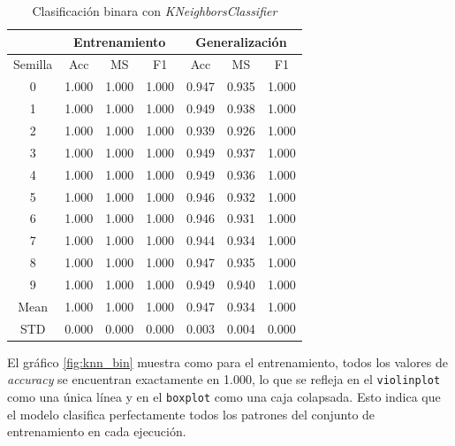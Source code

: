 \begin{table}[H]
	\centering
	\begin{tabular}{ |c|c|c|c|c|c|c| }
		\hline
		\rowcolor{LightCyan}
		 & \multicolumn{3}{c|}{Entrenamiento} & \multicolumn{3}{c|}{Generalización} \\
		\hline
		\rowcolor{LightCyan}
		 Semilla & Acc & MS & F1 & Acc & MS & F1 \\
		\hline
		0    & 1.000          & 1.000          & 1.000          & 0.947          & 0.935          & 1.000          \\
		1    & 1.000          & 1.000          & 1.000          & 0.949          & 0.938          & 1.000          \\
		2    & 1.000          & 1.000          & 1.000          & 0.939          & 0.926          & 1.000          \\
		3    & 1.000          & 1.000          & 1.000          & 0.949          & 0.937          & 1.000          \\
		4    & 1.000          & 1.000          & 1.000          & 0.949          & 0.936          & 1.000          \\
		5    & 1.000          & 1.000          & 1.000          & 0.946          & 0.932          & 1.000          \\
		6    & 1.000          & 1.000          & 1.000          & 0.946          & 0.931          & 1.000          \\
		7    & 1.000          & 1.000          & 1.000          & 0.944          & 0.934          & 1.000          \\
		8    & 1.000          & 1.000          & 1.000          & 0.947          & 0.935          & 1.000          \\
		9    & 1.000          & 1.000          & 1.000          & 0.949          & 0.940          & 1.000          \\
		Mean & 1.000          & 1.000          & 1.000          & 0.947          & 0.934          & 1.000          \\
		STD  & 0.000          & 0.000          & 0.000          & 0.003          & 0.004          & 0.000          \\
		\hline
	\end{tabular}
	\caption{Clasificación binara con \textit{KNeighborsClassifier}}
	\label{tabla:knn_bin}
\end{table}

\newpage
El gráfico \ref{fig:knn_bin} muestra como para el entrenamiento, todos los valores de \textit{accuracy} se encuentran exactamente en 1.000, lo que se refleja en el \texttt{violinplot} como una única línea y en el \texttt{boxplot} como una caja colapsada. Esto indica que el modelo clasifica perfectamente todos los patrones del conjunto de entrenamiento en cada ejecución.

